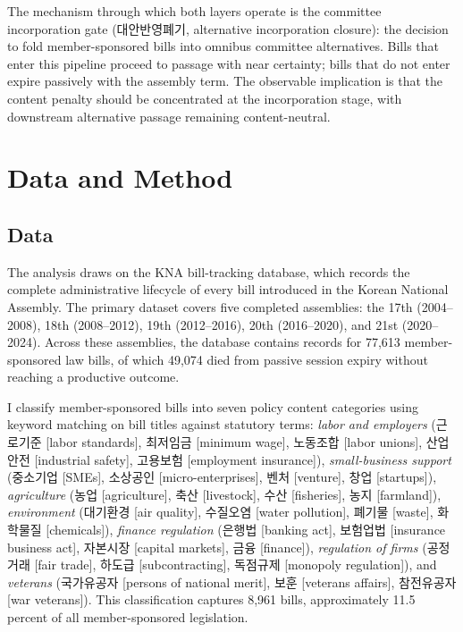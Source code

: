\documentclass[11pt]{article}
\begin{document}
The mechanism through which both layers operate is the committee incorporation gate (대안반영폐기, alternative incorporation closure): the decision to fold member-sponsored bills into omnibus committee alternatives. Bills that enter this pipeline proceed to passage with near certainty; bills that do not enter expire passively with the assembly term. The observable implication is that the content penalty should be concentrated at the incorporation stage, with downstream alternative passage remaining content-neutral.


\section{Data and Method}
\label{sec:data}

\subsection{Data}

The analysis draws on the KNA bill-tracking database, which records the complete administrative lifecycle of every bill introduced in the Korean National Assembly. The primary dataset covers five completed assemblies: the 17th (2004--2008), 18th (2008--2012), 19th (2012--2016), 20th (2016--2020), and 21st (2020--2024). Across these assemblies, the database contains records for 77,613 member-sponsored law bills, of which 49,074 died from passive session expiry without reaching a productive outcome.

I classify member-sponsored bills into seven policy content categories using keyword matching on bill titles against statutory terms: \textit{labor and employers} (근로기준 [labor standards], 최저임금 [minimum wage], 노동조합 [labor unions], 산업안전 [industrial safety], 고용보험 [employment insurance]), \textit{small-business support} (중소기업 [SMEs], 소상공인 [micro-enterprises], 벤처 [venture], 창업 [startups]), \textit{agriculture} (농업 [agriculture], 축산 [livestock], 수산 [fisheries], 농지 [farmland]), \textit{environment} (대기환경 [air quality], 수질오염 [water pollution], 폐기물 [waste], 화학물질 [chemicals]), \textit{finance regulation} (은행법 [banking act], 보험업법 [insurance business act], 자본시장 [capital markets], 금융 [finance]), \textit{regulation of firms} (공정거래 [fair trade], 하도급 [subcontracting], 독점규제 [monopoly regulation]), and \textit{veterans} (국가유공자 [persons of national merit], 보훈 [veterans affairs], 참전유공자 [war veterans]). This classification captures 8,961 bills, approximately 11.5 percent of all member-sponsored legislation.
\end{document}
